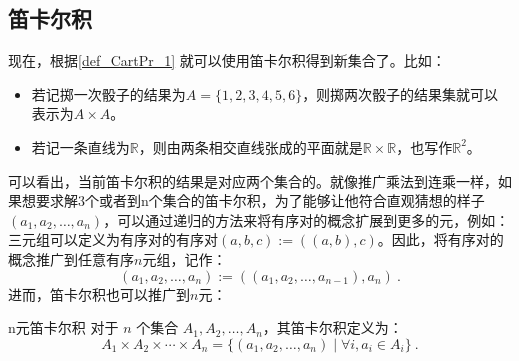 \subsection{笛卡尔积}

现在，根据\autoref{def_CartPr_1} 就可以使用笛卡尔积得到新集合了。比如：
\begin{itemize}
\item 若记掷一次骰子的结果为$A=\{1, 2, 3, 4, 5, 6\}$，则掷两次骰子的结果集就可以表示为$A\times A$。
\item 若记一条直线为${\mathbb R}$，则由两条相交直线张成的平面就是${\mathbb R}\times{\mathbb R}$，也写作${\mathbb R}^2$。
\end{itemize}
可以看出，当前笛卡尔积的结果是对应两个集合的。就像推广乘法到连乘一样，如果想要求解3个或者到n个集合的笛卡尔积，为了能够让他符合直观猜想的样子$(a_1, a_2, \ldots, a_n)$，可以通过递归的方法来将有序对的概念扩展到更多的元，例如：三元组可以定义为有序对的有序对$(a, b, c) := ((a, b), c)$。因此，将有序对的概念推广到任意有序$n$元组，记作：
\begin{equation}
(a_1, a_2, \ldots, a_n) := ((a_1, a_2, \ldots, a_{n-1}), a_n)~.
\end{equation}
进而，笛卡尔积也可以推广到$n$元：
\begin{definition}{n元笛卡尔积}
对于 $n$ 个集合 $A_1, A_2, \ldots, A_n$，其笛卡尔积定义为：
\begin{equation}
A_1 \times A_2 \times \cdots \times A_n = \{(a_1, a_2, \ldots, a_n) \mid \forall i,a_i \in A_i \} ~.
\end{equation}
\end{definition}